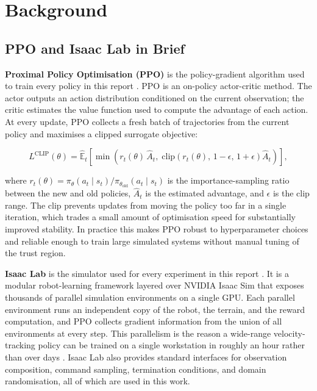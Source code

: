 \section{Background}

\subsection{PPO and Isaac Lab in Brief}

\textbf{Proximal Policy Optimisation (PPO)} is the policy-gradient algorithm used to train every policy in this report \cite{schulman2017}. PPO is an on-policy actor-critic method. The actor outputs an action distribution conditioned on the current observation; the critic estimates the value function used to compute the advantage of each action. At every update, PPO collects a fresh batch of trajectories from the current policy and maximises a clipped surrogate objective:

\[
L^{\mathrm{CLIP}}(\theta) = \hat{\mathbb{E}}_t \left[ \min\!\left( r_t(\theta)\, \hat{A}_t,\; \mathrm{clip}\!\left( r_t(\theta),\, 1 - \epsilon,\, 1 + \epsilon \right) \hat{A}_t \right) \right],
\]

where $r_t(\theta) = \pi_\theta(a_t \mid s_t) / \pi_{\theta_{\mathrm{old}}}(a_t \mid s_t)$ is the importance-sampling ratio between the new and old policies, $\hat{A}_t$ is the estimated advantage, and $\epsilon$ is the clip range. The clip prevents updates from moving the policy too far in a single iteration, which trades a small amount of optimisation speed for substantially improved stability. In practice this makes PPO robust to hyperparameter choices and reliable enough to train large simulated systems without manual tuning of the trust region.

\textbf{Isaac Lab} is the simulator used for every experiment in this report \cite{mittal2023}. It is a modular robot-learning framework layered over NVIDIA Isaac Sim that exposes thousands of parallel simulation environments on a single GPU. Each parallel environment runs an independent copy of the robot, the terrain, and the reward computation, and PPO collects gradient information from the union of all environments at every step. This parallelism is the reason a wide-range velocity-tracking policy can be trained on a single workstation in roughly an hour rather than over days \cite{rudin2022}. Isaac Lab also provides standard interfaces for observation composition, command sampling, termination conditions, and domain randomisation, all of which are used in this work.

